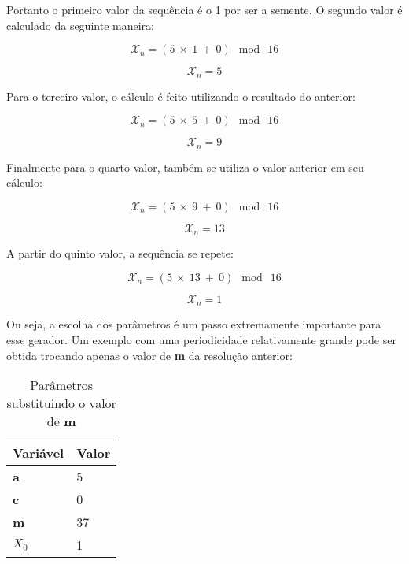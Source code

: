 Portanto o primeiro valor da sequência é o 1 por ser a semente. O segundo valor é calculado da seguinte maneira: 

\begin{equation}
	\label{Cálculo do segundo valor}
	\mathcal{X}_n = ( 5 \: \times \: 1 \: + \: 0) \: \bmod \: 16
\end{equation}

\begin{equation}
	\label{Resultado do segundo valor}
	\mathcal{X}_n = 5
\end{equation}

Para o terceiro valor, o cálculo é feito utilizando o resultado do anterior:

\begin{equation}
	\label{Cálculo do terceiro valor}
	\mathcal{X}_n = ( 5 \: \times \: 5\: +\: 0)\: \bmod \: 16
\end{equation}

\begin{equation}
	\label{Resultado do terceiro valor}
	\mathcal{X}_n = 9
\end{equation}

Finalmente para o quarto valor, também se utiliza o valor anterior em seu cálculo:

\begin{equation}
	\label{Cálculo do quarto valor}
	\mathcal{X}_n = ( 5 \: \times \: 9 \: + \: 0) \: \bmod \: 16
\end{equation}

\begin{equation}
	\label{Resultado do quarto valor}
	\mathcal{X}_n = 13
\end{equation}

A partir do quinto valor, a sequência se repete:

\begin{equation}
	\label{Cálculo do quinto valor}
	\mathcal{X}_n = ( 5 \: \times \: 13 \: + \: 0) \: \bmod \: 16
\end{equation}

\begin{equation}
	\label{Resultado do quinto valor}
	\mathcal{X}_n = 1
\end{equation}

Ou seja, a escolha dos parâmetros é um passo extremamente importante para esse gerador. Um exemplo com uma periodicidade relativamente grande pode ser obtida trocando apenas o valor de \textbf{m} da resolução anterior:

\begin{table}[h]
	\centering
	\begin{tabular}{|l|l|}	
		\hline
		Variável & Valor \\ \hline
		\textbf{a} & 5 \\ \hline
		\textbf{c} & 0 \\ \hline
		\textbf{m} & 37 \\ \hline
		\textbf{$X_0$} & 1 \\ \hline
	\end{tabular}
	\caption{Parâmetros substituindo o valor de \textbf{m}}
\end{table}

